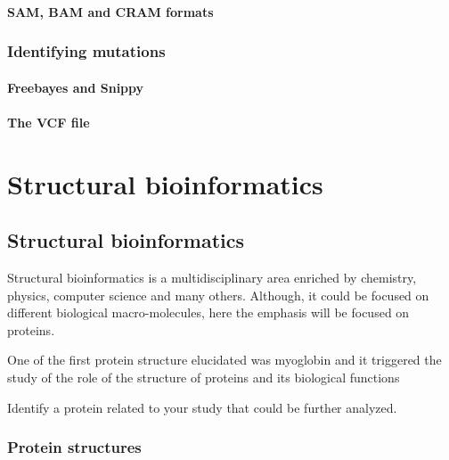 \documentclass[
  letterpaper,
  DIV=11,
  numbers=noendperiod,
  oneside]{scrreprt}
\begin{document}
\hypertarget{sam-bam-and-cram-formats}{%
\subsection{SAM, BAM and CRAM formats}\label{sam-bam-and-cram-formats}}

\hypertarget{identifying-mutations}{%
\section{Identifying mutations}\label{identifying-mutations}}

\hypertarget{freebayes-and-snippy}{%
\subsection{Freebayes and Snippy}\label{freebayes-and-snippy}}

\hypertarget{the-vcf-file}{%
\subsection{The VCF file}\label{the-vcf-file}}

\part{Structural bioinformatics}

\hypertarget{sec-biostructural}{%
\chapter{Structural bioinformatics}\label{sec-biostructural}}

Structural bioinformatics is a multidisciplinary area enriched by
chemistry, physics, computer science and many others. Although, it could
be focused on different biological macro-molecules, here the emphasis
will be focused on proteins.

One of the first protein structure elucidated was myoglobin and it
triggered the study of the role of the structure of proteins and its
biological functions

Identify a protein related to your study that could be further analyzed.

\hypertarget{protein-structures}{%
\section{Protein structures}\label{protein-structures}}
\end{document}
